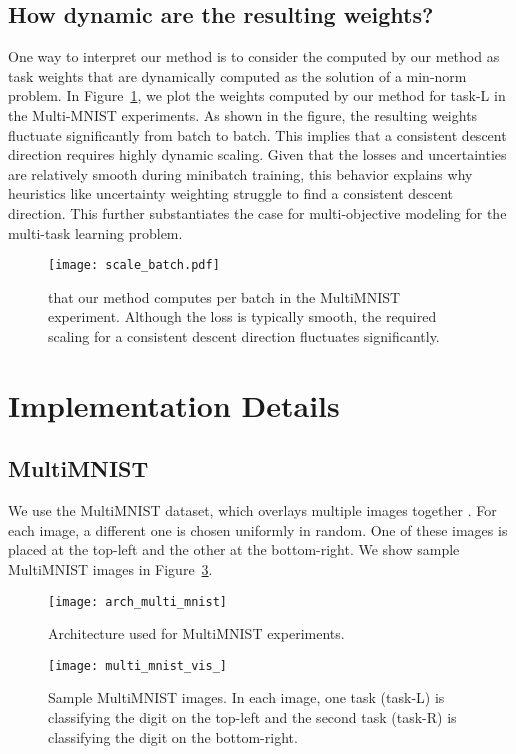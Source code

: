 \documentclass{article}
\begin{document}
\subsection{How dynamic are the resulting weights?}
\label{sec:additional_ablation}
One way to interpret our method is to consider the  computed by our method as task weights that are dynamically computed as the solution of a min-norm problem. In Figure~\ref{fig:mnist_scales}, we plot the weights computed by our method for task-L in the Multi-MNIST experiments. As shown in the figure, the resulting weights fluctuate significantly from batch to batch. This implies that a consistent descent direction requires highly dynamic scaling. Given that the losses and uncertainties are relatively smooth during minibatch training, this behavior explains why heuristics like uncertainty weighting \citep{Kendall2018} struggle to find a consistent descent direction. This further substantiates the case for multi-objective modeling for the multi-task learning problem.

\begin{figure}[H]\texttt{[image: scale\_batch.pdf]}
\caption{ that our method computes per batch in the MultiMNIST experiment. Although the loss is typically smooth, the required scaling for a consistent descent direction fluctuates significantly.}
\label{fig:mnist_scales}
\end{figure}
\fi \section{Implementation Details}


\subsection{MultiMNIST}
We use the MultiMNIST dataset, which overlays multiple images together \citep{multi_mnist}. For each image, a different one is chosen uniformly in random. One of these images is placed at the top-left and the other at the bottom-right. We show sample MultiMNIST images in Figure~\ref{fig:sample_multi_mnist}.

\begin{figure}[ht]
\texttt{[image: arch\_multi\_mnist]}
\caption{Architecture used for MultiMNIST experiments.}
\label{fig:multi_mnist}
\end{figure}

\begin{figure}[hb]
\texttt{[image: multi\_mnist\_vis\_]}
\caption{Sample MultiMNIST images. In each image, one task (task-L) is classifying the digit on the top-left and the second task (task-R) is classifying the digit on the bottom-right.}
\label{fig:sample_multi_mnist}
\end{figure}
\end{document}
